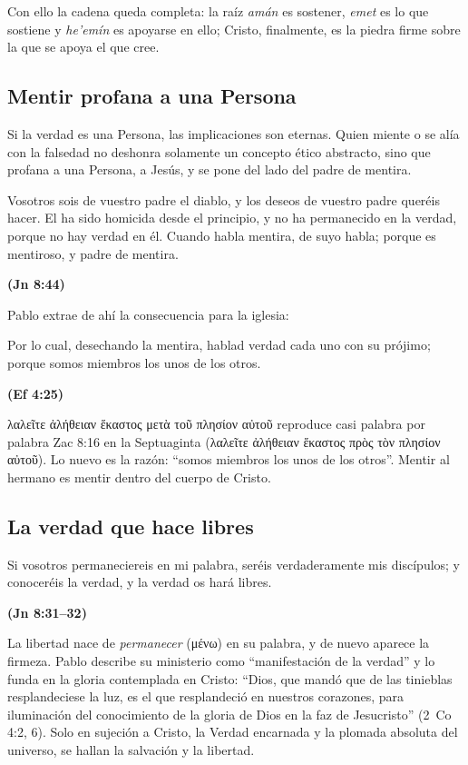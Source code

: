 \documentclass[11pt,letterpaper]{article}
\newcommand{\grc}[1]{\foreignlanguage{ancientgreek}{#1}}
\newcommand{\fuente}[1]{\par\hfill{\upshape\bfseries\small\textcolor{azul}{#1}}}
\begin{document}
Con ello la cadena queda completa: la raíz \emph{amán} es sostener, \emph{emet} es lo que sostiene y \emph{he'emín} es apoyarse en ello; Cristo, finalmente, es la piedra firme sobre la que se apoya el que cree.

\subsection{Mentir profana a una Persona}
Si la verdad es una Persona, las implicaciones son eternas. Quien miente o se alía con la falsedad no deshonra solamente un concepto ético abstracto, sino que profana a una Persona, a Jesús, y se pone del lado del padre de mentira.

\begin{cita}Vosotros sois de vuestro padre el diablo, y los deseos de vuestro padre queréis hacer. El ha sido homicida desde el principio, y no ha permanecido en la verdad, porque no hay verdad en él. Cuando habla mentira, de suyo habla; porque es mentiroso, y padre de mentira.\fuente{(Jn 8:44)}\end{cita}

Pablo extrae de ahí la consecuencia para la iglesia:

\begin{cita}Por lo cual, desechando la mentira, hablad verdad cada uno con su prójimo; porque somos miembros los unos de los otros.\fuente{(Ef 4:25)}\end{cita}

\grc{λαλεῖτε ἀλήθειαν ἕκαστος μετὰ τοῦ πλησίον αὐτοῦ} reproduce casi palabra por palabra Zac 8:16 en la Septuaginta (\grc{λαλεῖτε ἀλήθειαν ἕκαστος πρὸς τὸν πλησίον αὐτοῦ}). Lo nuevo es la razón: ``somos miembros los unos de los otros''. Mentir al hermano es mentir dentro del cuerpo de Cristo.

\subsection{La verdad que hace libres}
\begin{cita}Si vosotros permaneciereis en mi palabra, seréis verdaderamente mis discípulos; y conoceréis la verdad, y la verdad os hará libres.\fuente{(Jn 8:31--32)}\end{cita}

La libertad nace de \emph{permanecer} (\grc{μένω}) en su palabra, y de nuevo aparece la firmeza. Pablo describe su ministerio como ``manifestación de la verdad'' y lo funda en la gloria contemplada en Cristo: ``Dios, que mandó que de las tinieblas resplandeciese la luz, es el que resplandeció en nuestros corazones, para iluminación del conocimiento de la gloria de Dios en la faz de Jesucristo'' (2~Co 4:2, 6). Solo en sujeción a Cristo, la Verdad encarnada y la plomada absoluta del universo, se hallan la salvación y la libertad.
\end{document}
